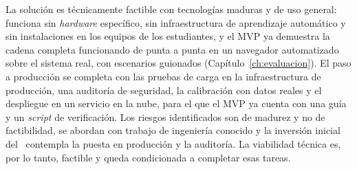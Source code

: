 La solución es técnicamente factible con tecnologías maduras y de uso general: funciona sin \textit{hardware} específico, sin infraestructura de aprendizaje automático y sin instalaciones en los equipos de los estudiantes, y el MVP ya demuestra la cadena completa funcionando de punta a punta en un navegador automatizado sobre el sistema real, con escenarios guionados (Capítulo~\ref{ch:evaluacion}). El paso a producción se completa con las pruebas de carga en la infraestructura de producción, una auditoría de seguridad, la calibración con datos reales y el despliegue en un servicio en la nube, para el que el MVP ya cuenta con una guía y un \textit{script} de verificación. Los riesgos identificados son de madurez y no de factibilidad, se abordan con trabajo de ingeniería conocido y la inversión inicial del \ contempla la puesta en producción y la auditoría. La viabilidad técnica es, por lo tanto, factible y queda condicionada a completar esas tareas.
